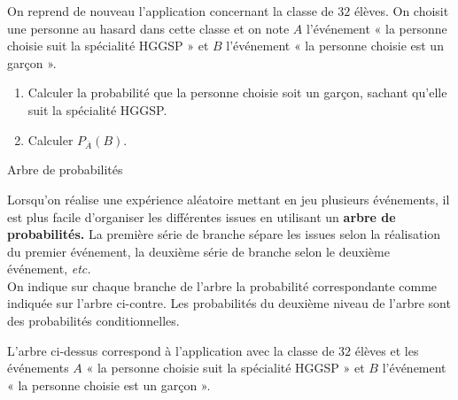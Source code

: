 \documentclass[11pt]{article}
\begin{document}
\begin{app}
  On reprend de nouveau l'application concernant la classe de $32$ élèves. On
  choisit une personne au hasard dans cette classe et on note $A$ l'événement «
  la personne choisie suit la spécialité HGGSP » et $B$ l'événement « la
  personne choisie est un garçon ».
  \begin{enumerate}
    \item Calculer la probabilité que la personne choisie soit un garçon,
      sachant qu'elle suit la spécialité HGGSP.
    \item Calculer $P_{\overline A}\left( B \right)$.
  \end{enumerate}
\end{app}

\begin{defi}{Arbre de probabilités}
  \begin{minipage}{.4\textwidth}
    Lorsqu'on réalise une expérience aléatoire mettant en jeu plusieurs
    événements, il est plus facile d'organiser les différentes issues en
    utilisant un \textbf{arbre de probabilités.} La première série de branche
    sépare les issues selon la réalisation du premier événement, la deuxième
    série de branche selon le deuxième événement, \emph{etc.}\\[2mm]
    On indique sur chaque branche de l'arbre la probabilité correspondante comme
    indiquée sur l'arbre ci-contre. Les probabilités du deuxième niveau de
    l'arbre sont des probabilités conditionnelles.
\end{minipage}
  \begin{minipage}{.6\textwidth}
    \begin{center}
\end{center}    
  \end{minipage}
\end{defi}

\begin{exemple}
  L'arbre ci-dessus correspond à l'application avec la classe de $32$ élèves et
  les événements $A$ «
  la personne choisie suit la spécialité HGGSP » et $B$ l'événement « la
  personne choisie est un garçon ».
\end{exemple}
\end{document}
